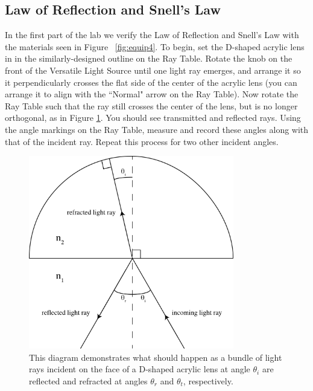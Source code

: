 \subsection{Law of Reflection and Snell's Law}
\label{sec:refsnell}
In the first part of the lab we verify the Law of Reflection and Snell's Law with the materials seen in Figure ~\ref{fig:equip4}.  To begin, set the D-shaped acrylic lens in in the similarly-designed outline on the Ray Table.  Rotate the knob on the front of the Versatile Light Source until one light ray emerges, and arrange it so it perpendicularly crosses the flat side of the center of the acrylic lens (you can arrange it to align with the ``Normal" arrow on the Ray Table).  Now rotate the Ray Table such that the ray still crosses the center of the lens, but is no longer orthogonal, as in Figure \ref{fig:slaw}.  You should see transmitted and reflected rays.  Using the angle markings on the Ray Table, measure and record these angles along with that of the incident ray.  Repeat this process for two other incident angles.\myskip

\begin{figure}[h]
\centering
\includegraphics[width=0.8\textwidth]{./Exp6/pic/snelllawdiagram.png}
\caption{This diagram demonstrates what should happen as a bundle of light rays incident on the face of a D-shaped acrylic lens at angle $\theta_{i}$ are reflected and refracted at angles $\theta_{r}$ and $\theta_{t}$, respectively.}
\label{fig:slaw}
\end{figure} 

